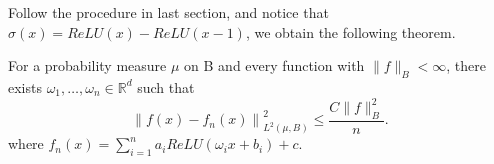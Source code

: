 %
%


Follow the procedure in last section, and notice that $\sigma(x)=ReLU(x)-ReLU(x-1)$, we obtain the following theorem.


\begin{theorem}
	For a probability measure $\mu$ on B and every function with $\|f\|_B<\infty$, there exists $\omega_1,\dots,\omega_n\in\mathbb{R}^d$ such that 
$$
\left\|f(x)-f_n(x)\right\|^2_{L^2(\mu,B)}\le \frac{C\|f\|^2_B}{n}.
$$
where $f_n(x)=\sum_{i=1}^{n}a_iReLU(\omega_i x+b_i)+c$.
\end{theorem}
